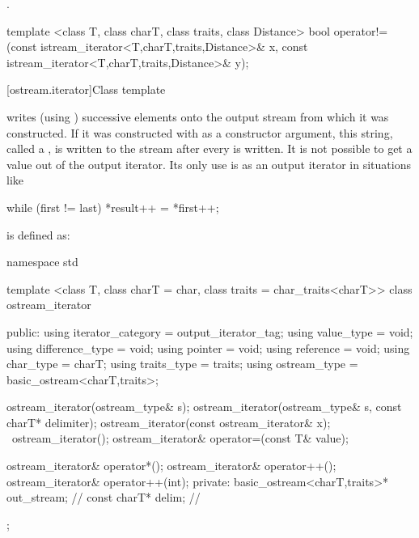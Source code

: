 \begin{itemdescr}
\pnum
\returns
{}.%
\end{itemdescr}

%
\begin{itemdecl}
template <class T, class charT, class traits, class Distance>
  bool operator!=(const istream_iterator<T,charT,traits,Distance>& x,
                  const istream_iterator<T,charT,traits,Distance>& y);
\end{itemdecl}

\begin{itemdescr}
\pnum
\returns
{}
\end{itemdescr}

[ostream.iterator]{Class template }

\pnum
{}%
writes (using
)
successive elements onto the output stream from which it was constructed.
If it was constructed with
as a constructor argument, this string, called a
,
is written to the stream after every
is written.
It is not possible to get a value out of the output iterator.
Its only use is as an output iterator in situations like

\begin{codeblock}
while (first != last)
  *result++ = *first++;
\end{codeblock}

\pnum
{}
is defined as:

\begin{codeblock}
namespace std {
  template <class T, class charT = char, class traits = char_traits<charT>>
  class ostream_iterator {
  public:
    using iterator_category = output_iterator_tag;
    using value_type        = void;
    using difference_type   = void;
    using pointer           = void;
    using reference         = void;
    using char_type         = charT;
    using traits_type       = traits;
    using ostream_type      = basic_ostream<charT,traits>;

    ostream_iterator(ostream_type& s);
    ostream_iterator(ostream_type& s, const charT* delimiter);
    ostream_iterator(const ostream_iterator& x);
    ~ostream_iterator();
    ostream_iterator& operator=(const T& value);

    ostream_iterator& operator*();
    ostream_iterator& operator++();
    ostream_iterator& operator++(int);
  private:
    basic_ostream<charT,traits>* out_stream;  // \expos
    const charT* delim;                       // \expos
  };
}
\end{codeblock}

